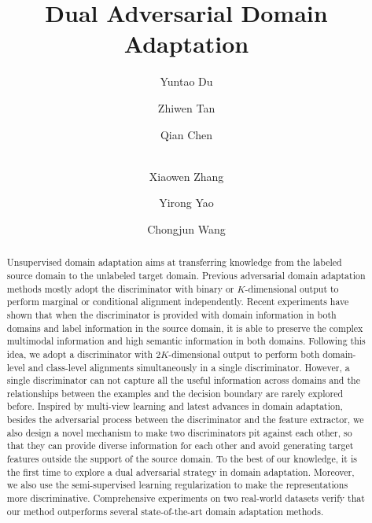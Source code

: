 \documentclass{ecai}
\begin{document}
\title{Dual Adversarial Domain Adaptation}

\author{
Yuntao Du  \and
Zhiwen Tan   \and
Qian Chen   \and \\
Xiaowen Zhang   \and
Yirong Yao   \and
Chongjun Wang
}

\maketitle


\begin{abstract}
Unsupervised domain adaptation aims at transferring knowledge from the labeled source domain to the unlabeled target domain. Previous adversarial domain adaptation methods mostly adopt the discriminator with binary or $K$-dimensional output  to perform marginal or conditional alignment independently. Recent experiments have shown that when the discriminator is provided with domain information in both domains and label information in the source domain, it is able to preserve the complex multimodal information and high semantic information in both domains. Following this idea, we adopt a discriminator with $2K$-dimensional output to perform both domain-level and class-level alignments simultaneously in a single discriminator. However, a single discriminator can not capture all the useful information across domains and the relationships between the examples and the decision boundary are rarely explored before. Inspired by multi-view learning and latest advances in domain adaptation, besides the adversarial process between the discriminator and the feature extractor, we also design a novel mechanism to make two discriminators pit against each other, so that they can provide diverse information for each other and avoid generating target features outside the support of the source domain.  To the best of our knowledge, it is the first time to explore a dual adversarial strategy in domain adaptation. Moreover, we also use the semi-supervised learning regularization to make the representations more discriminative. Comprehensive experiments on two real-world datasets verify that our method outperforms several state-of-the-art domain adaptation methods.
\end{abstract}
\end{document}
